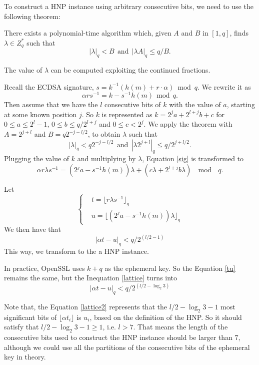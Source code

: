 To construct a HNP instance using arbitrary consecutive bits, we need to use the following theorem\cite{Nguyen2002}:
\begin{theorem}
 \label{theorem1}
There exists a polynomial-time algorithm which, given $A$ and $B$ in $[1, q]$, finds $\lambda \in Z^{*}_{q}$ such that
$$
|\lambda |_q < B  \ \  \text{and} \ \  |\lambda A|_q \leq q/B .
$$
\end{theorem}
The value of $\lambda$ can be computed exploiting the continued fractions.

Recall the ECDSA signature, $s = k^{-1} (h(m) + r\cdot\alpha) \bmod q$.
We rewrite it as
\begin{equation}
\label{sig}
\alpha rs^{-1} = k - s^{-1}h(m)  \ \  \text{mod} \ \ q.
\end{equation}
Then assume that we have the $l$ consecutive bits of $k$ with the value of $a$, starting at some known position $j$.
 So $k$ is represented as $k = 2^{j}a + 2^{l+j}b +c$ for $0 \leq a \leq 2^l -1$, $0\leq b \leq q/2^{l+j}$ and $0 \leq c < 2^j$.
 We apply the theorem with $A = 2^{j+l}$ and $B = q2^{-j-l/2}$, to obtain $\lambda$ such that
$$
|\lambda |_q < q2^{-j-l/2}  \ \  \text{and} \ \  |\lambda 2^{j+l}|_q \leq q/2^{j+l/2} .
$$
Plugging the value of $k$ and multiplying by $\lambda$, Equation \ref{sig} is transformed to
$$
\alpha r\lambda s^{-1} = (2^{j}a - s^{-1}h(m))\lambda +(c\lambda + 2^{l+j}b\lambda)  \ \  \bmod \ \ q.
$$

 Let
 \begin{equation}
 \label{tu}
 \left\{
 \begin{aligned}
 	&t = \lfloor r\lambda s^{-1} \rfloor_q    \\
 	&u = \lfloor (2^{j}a - s^{-1}h(m))\lambda \rfloor_q
 \end{aligned}
 \right.
 \end{equation}
We then have that
 \begin{equation}
\label{lattice}
    |\alpha t - u|_q < q/2^{(l/2-1)}
\end{equation}
This way, we transform to the a HNP instance.

In practice, OpenSSL uses $k+q$ as the ephemeral key. So the Equation \ref{tu} remains the same, but the Inequation \ref{lattice} turns into
 \begin{equation}
\label{lattice2}
    |\alpha t - u|_q < q/2^{(l/2-\log_{2}{3})}
\end{equation}

Note that, the Equation \ref{lattice2} represents that the $l/2-\log_{2}{3} -1$ most significant bits of $\lfloor\alpha t_i\rfloor$ is $u_i$, based on the definition of the HNP.
So it should satisfy that $l/2-\log_{2}{3} -1 \geq 1$, i.e. $l > 7$.
That means the length of the consecutive bits used to  construct the HNP instance should be larger than $7$,
although we could use all the partitions of the consecutive bits of the ephemeral key in theory.

